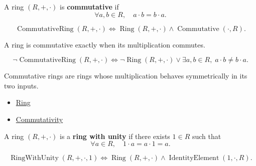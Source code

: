 \begin{definition}
\label{def:algebraic-commutative-ring}
A ring $(R,+,\cdot)$ is \textbf{commutative} if
\[
\forall a,b \in R,\quad a\cdot b=b\cdot a.
\]
\end{definition}

\begin{remark*}
\[
\operatorname{CommutativeRing}(R,+,\cdot)
\Longleftrightarrow
\operatorname{Ring}(R,+,\cdot)
\land
\operatorname{Commutative}(\cdot,R).
\]
\end{remark*}

\begin{remark*}
A ring is commutative exactly when its multiplication commutes.
\end{remark*}

\begin{remark*}
\[
\neg\operatorname{CommutativeRing}(R,+,\cdot)
\Longleftrightarrow
\neg\operatorname{Ring}(R,+,\cdot)
\lor
\exists a,b\in R,\; a\cdot b\neq b\cdot a.
\]
\end{remark*}

\begin{remark*}[Interpretation]
Commutative rings are rings whose multiplication behaves symmetrically in its
two inputs.
\end{remark*}

\begin{dependencies}
\begin{itemize}
  \item \hyperref[def:algebraic-ring]{Ring}
  \item \hyperref[def:algebraic-commutativity]{Commutativity}
\end{itemize}
\end{dependencies}

\begin{definition}
\label{def:algebraic-ring-with-unity}
A ring $(R,+,\cdot)$ is a \textbf{ring with unity} if there exists
$1\in R$ such that
\[
\forall a \in R,\quad 1\cdot a=a\cdot 1=a.
\]
\end{definition}

\begin{remark*}
\[
\operatorname{RingWithUnity}(R,+,\cdot,1)
\Longleftrightarrow
\operatorname{Ring}(R,+,\cdot)
\land
\operatorname{IdentityElement}(1,\cdot,R).
\]
\end{remark*}


